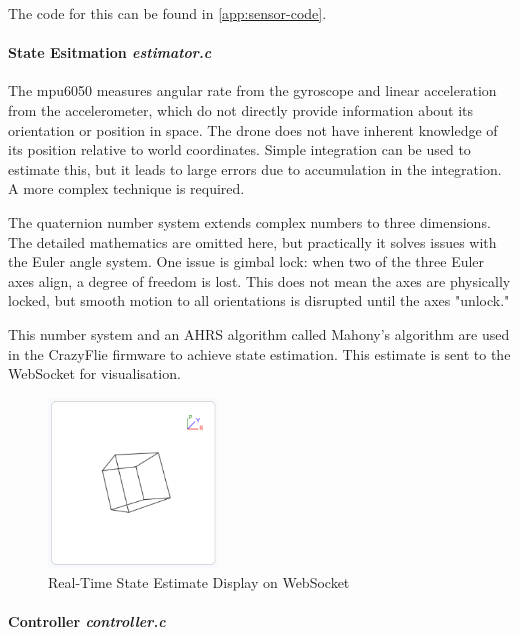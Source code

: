 The code for this can be found in \ref{app:sensor-code}.

\paragraph{\textbf{State Esitmation} \textit{estimator.c}} \leavevmode 

The \gls{mpu6050} measures angular rate from the gyroscope and linear acceleration from the accelerometer, which do not directly provide information about its orientation or position in space. The drone does not have inherent knowledge of its position relative to world coordinates. Simple integration can be used to estimate this, but it leads to large errors due to accumulation in the integration. A more complex technique is required.

The quaternion number system extends complex numbers to three dimensions. The detailed mathematics are omitted here, but practically it solves issues with the Euler angle system. One issue is gimbal lock: when two of the three Euler axes align, a degree of freedom is lost. This does not mean the axes are physically locked, but smooth motion to all orientations is disrupted until the axes "unlock."  

This number system and an AHRS algorithm called Mahony's algorithm are used in the CrazyFlie firmware to achieve state estimation. This estimate is sent to the WebSocket for visualisation.

\begin{figure}[H]
    \centering
    \captionsetup{justification=centering, margin=1cm}
    \includegraphics[width=0.4\textwidth]{img/websocket-state.PNG}
    \caption{Real-Time State Estimate Display on WebSocket}
    \label{fig:ws-state}
\end{figure}

\paragraph{\textbf{Controller} \textit{controller.c}} \leavevmode 


